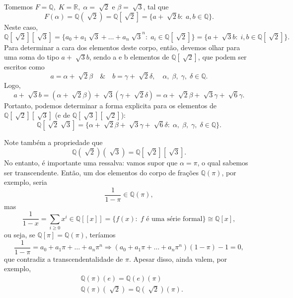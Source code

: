 \documentclass[../algebraIII_notes.tex]{subfiles}
\begin{document}
\begin{example}
	Tomemos \(F = \mathbb{Q},\; K = \mathbb{R},\; \alpha = \sqrt[]{2}\) e \(\beta = \sqrt[]{3}\), tal que
	\[
		F(\alpha )=\mathbb{Q}(\sqrt[]{2})=\mathbb{Q}[\sqrt[]{2}]=\{a+\sqrt[]{2}b:\; a, b\in \mathbb{Q}\}.
	\]
	Neste caso,
	\[
		\mathbb{Q}[\sqrt[]{2}][\sqrt[]{3}]=\{a_{0}+a_{1}\sqrt[]{3}+\dotsc +a_{n}\sqrt[]{3}^{n}:\; a_{i}\in \mathbb{Q}[\sqrt[]{2}]\} = \{a+\sqrt[]{3}b:\; i, b\in \mathbb{Q}[\sqrt[]{2}]\}.
	\]
	Para determinar a cara dos elementos deste corpo, então, devemos olhar para uma soma do tipo \(a+\sqrt[]{3}b\), sendo a e b elementos de \(\mathbb{Q}[\sqrt[]{2}]\), que podem ser escritos como
	\[
		a = \alpha +\sqrt[]{2}\beta  \quad\&\quad b = \gamma +\sqrt[]{2}\delta, \quad \alpha ,\;\beta ,\; \gamma ,\; \delta \in \mathbb{Q}.
	\]
	Logo,
	\[
		a+\sqrt[]{3}b = (\alpha + \sqrt[]{2}\beta )+\sqrt[]{3}(\gamma + \sqrt[]{2}\delta )= \alpha +\sqrt[]{2}\beta +\sqrt[]{3}\gamma +\sqrt[]{6}\gamma.
	\]
	Portanto, podemos determinar a forma explicita para os elementos de \(\mathbb{Q}[\sqrt[]{2}][\sqrt[]{3}]\) (e de \(\mathbb{Q}[\sqrt[]{3}][\sqrt[]{2}]\)):
	\[
		\mathbb{Q}[\sqrt[]{2}\sqrt[]{3}]=\{\alpha +\sqrt[]{2}\beta +\sqrt[]{3}\gamma + \sqrt[]{6}\delta :\; \alpha ,\; \beta ,\; \gamma ,\; \delta \in \mathbb{Q}\}.
	\]

	Note também a propriedade que
	\[
		\mathbb{Q}(\sqrt[]{2})(\sqrt[]{3})=\mathbb{Q}[\sqrt[]{2}][\sqrt[]{3}].
	\]
	No entanto, é importante uma ressalva: vamos supor que \(\alpha = \pi \), o qual sabemos ser transcendente. Então, um dos elementos do corpo de frações \(\mathbb{Q}(\pi )\), por exemplo, seria
	\[
		\frac{1}{1-\pi }\in \mathbb{Q}(\pi ),
	\]
	mas
	\[
		\frac{1}{1-x}=\sum\limits_{i\geq 0}^{}x^{i}\in \mathbb{Q}[[x]] = \{f(x):\; f \text{ é uma série formal}\} \cong \mathbb{Q}[x],
	\]
	ou seja, se \(\mathbb{Q}[\pi ] = \mathbb{Q}(\pi )\), teríamos
	\[
		\frac{1}{1-\pi } = a_{0}+a_1\pi +\dotsc +a_{n}\pi^{n} \Rightarrow (a_{0}+a_1\pi +\dotsc + a_{n}\pi^{n})(1-\pi )-1=0,
	\]
	que contradiz a transcendentalidade de \(\pi.\) Apesar disso, ainda valem, por exemplo,
	\begin{align*}
		 & \mathbb{Q}(\pi )(e)=\mathbb{Q}(e)(\pi )                      \\
		 & \mathbb{Q}(\pi )(\sqrt[]{2}) = \mathbb{Q}(\sqrt[]{2})(\pi ).
	\end{align*}
\end{example}
\end{document}
